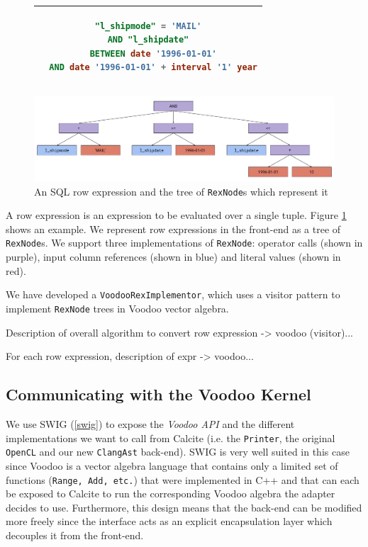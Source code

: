 \begin{figure}
    \centering
    \begin{tabular}{|c|}
    \hline
    \begin{lstlisting}[language=SQL]
"l_shipmode" = 'MAIL'
AND "l_shipdate"
  BETWEEN date '1996-01-01'
  AND date '1996-01-01' + interval '1' year
    \end{lstlisting} \\
    \hline
    \end{tabular}
    \includegraphics[width=\linewidth]{design-and-implementation/rex-node.pdf}
    \caption{An SQL row expression and the tree of \texttt{RexNode}s which represent it}
    \label{fig:rex}
\end{figure}

A row expression is an expression to be evaluated over a single tuple. Figure \ref{fig:rex} shows an example. We represent row expressions in the front-end as a tree of \texttt{RexNode}s. We support three implementations of \texttt{RexNode}: operator calls (shown in purple), input column references (shown in blue) and literal values (shown in red).

We have developed a \texttt{VoodooRexImplementor}, which uses a visitor pattern to implement \texttt{RexNode} trees in Voodoo vector algebra.

Description of overall algorithm to convert row expression -> voodoo (visitor)...

For each row expression, description of expr -> voodoo...

\subsection{Communicating with the Voodoo Kernel}\label{swig features}

We use SWIG (\ref{swig}) to expose the \emph{Voodoo API} and the different implementations we want to call from Calcite (i.e. the \texttt{Printer}, the original \texttt{OpenCL} and our new \texttt{ClangAst} back-end). SWIG is very well suited in this case since Voodoo is a vector algebra language that contains only a limited set of functions (\texttt{Range, Add, etc.}) that were implemented in C++ and that can each be exposed to Calcite to run the corresponding Voodoo algebra the adapter decides to use. Furthermore, this design means that the back-end can be modified more freely since the interface acts as an explicit encapsulation layer which decouples it from the front-end.

